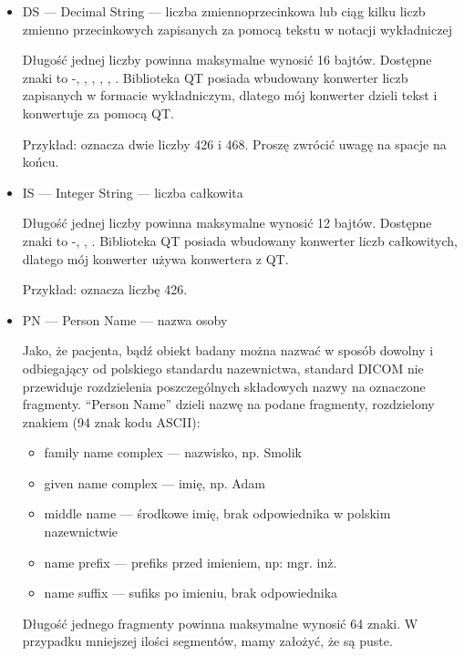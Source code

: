 \begin{itemize}
    \item DS --- Decimal String --- liczba zmiennoprzecinkowa lub ciąg kilku liczb zmienno przecinkowych zapisanych za pomocą tekstu w notacji wykładniczej

          Długość jednej liczby powinna maksymalne wynosić 16 bajtów.
          Dostępne znaki to -, \dataword{+}, \dataword{-}, , , .
          Biblioteka QT posiada wbudowany konwerter liczb zapisanych w formacie wykładniczym, dlatego mój konwerter dzieli tekst i konwertuje za pomocą QT.

          Przykład:  oznacza dwie liczby 426 i 468. Proszę zwrócić uwagę na spacje na końcu.

    \item IS --- Integer String --- liczba całkowita

          Długość jednej liczby powinna maksymalne wynosić 12 bajtów.
          Dostępne znaki to -, \dataword{+}, \dataword{-}.
          Biblioteka QT posiada wbudowany konwerter liczb całkowitych, dlatego mój konwerter używa konwertera z QT.

          Przykład:   oznacza liczbę 426.

    \item PN --- Person Name --- nazwa osoby

          Jako, że pacjenta, bądź obiekt badany można nazwać w sposób dowolny i odbiegający od polskiego standardu nazewnictwa, standard DICOM nie przewiduje rozdzielenia poszczególnych składowych nazwy na oznaczone fragmenty.
          \enquote{Person Name} dzieli nazwę na podane fragmenty, rozdzielony znakiem \dataword{\^{}} (94 znak kodu ASCII):
          \begin{itemize}
              \item family name complex --- nazwisko, np. Smolik
              \item given name complex --- imię, np. Adam
              \item middle name --- środkowe imię, brak odpowiednika w polskim nazewnictwie
              \item name prefix --- prefiks przed imieniem, np: mgr. inż.
              \item name suffix --- sufiks po imieniu, brak odpowiednika
          \end{itemize}
          Długość jednego fragmenty powinna maksymalne wynosić 64 znaki.
          W przypadku mniejszej ilości segmentów, mamy założyć, że są puste.


\end{itemize}
